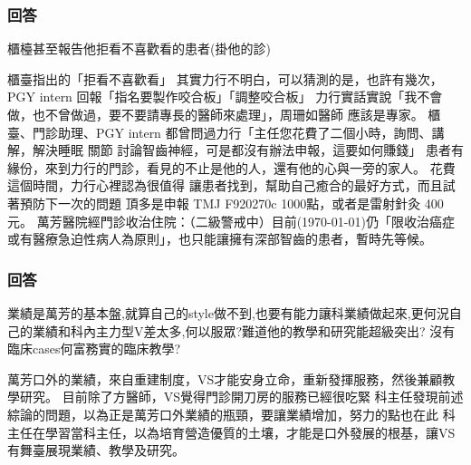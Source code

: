 \documentclass[t,24pt,aspectratio=169]{beamer}
\begin{document}
\begin{frame}[hoved]
\frametitle{回答}
櫃檯甚至報告他拒看不喜歡看的患者(掛他的診)
\begin{outline}
\1  櫃臺指出的「拒看不喜歡看」
    \2 其實力行不明白，可以猜測的是，也許有幾次，PGY intern 回報「指名要製作咬合板」「調整咬合板」
    \2 力行實話實說「我不會做，也不曾做過，要不要請專長的醫師來處理」，周珊如醫師 應該是專家。
\1 櫃臺、門診助理、PGY intern 都曾問過力行「主任您花費了二個小時，詢問、講解，解決睡眠 關節 討論智齒神經，可是都沒有辦法申報，這要如何賺錢」
    \2 患者有緣份，來到力行的門診，看見的不止是他的人，還有他的心與一旁的家人。
    \2 花費這個時間，力行心裡認為很值得
    \2 讓患者找到，幫助自己癒合的最好方式，而且試著預防下一次的問題
    \2 頂多是申報 TMJ F920270c 1000點，或者是雷射針灸 400元。
    \2 萬芳醫院經門診收治住院：（二級警戒中）目前(\today)仍「限收治癌症或有醫療急迫性病人為原則」，也只能讓擁有深部智齒的患者，暫時先等候。
\end{outline}


\end{frame}


\begin{frame}[hoved]
\frametitle{回答}
業績是萬芳的基本盤,就算自己的style做不到,也要有能力讓科業績做起來,更何況自己的業績和科內主力型V差太多,何以服眾?難道他的教學和研究能超級突出?
沒有臨床cases何富務實的臨床教學?

\begin{outline}
\1 萬芳口外的業績，來自重建制度，VS才能安身立命，重新發揮服務，然後兼顧教學研究。
    \2 目前除了方醫師，VS覺得門診開刀房的服務已經很吃緊
    \2 科主任發現前述綜論的問題，以為正是萬芳口外業績的瓶頸，要讓業績增加，努力的點也在此
    \2 科主任在學習當科主任，以為培育營造優質的土壤，才能是口外發展的根基，讓VS有舞臺展現業績、教學及研究。

\end{outline}

\end{frame}
\end{document}
